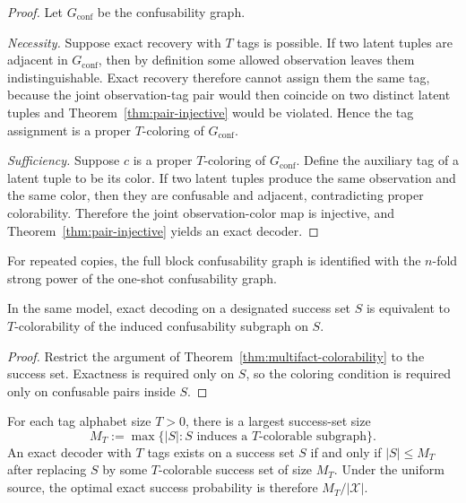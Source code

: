 \begin{proof}
Let $G_{\mathrm{conf}}$ be the confusability graph.

\emph{Necessity.} Suppose exact recovery with $T$ tags is possible. If two latent tuples are adjacent in $G_{\mathrm{conf}}$, then by definition some allowed observation leaves them indistinguishable. Exact recovery therefore cannot assign them the same tag, because the joint observation-tag pair would then coincide on two distinct latent tuples and Theorem~\ref{thm:pair-injective} would be violated. Hence the tag assignment is a proper $T$-coloring of $G_{\mathrm{conf}}$.

\emph{Sufficiency.} Suppose $c$ is a proper $T$-coloring of $G_{\mathrm{conf}}$. Define the auxiliary tag of a latent tuple to be its color. If two latent tuples produce the same observation and the same color, then they are confusable and adjacent, contradicting proper colorability. Therefore the joint observation-color map is injective, and Theorem~\ref{thm:pair-injective} yields an exact decoder.
\end{proof}

For repeated copies, the full block confusability graph is identified with the $n$-fold strong power of the one-shot confusability graph.

\begin{theorem}\label{thm:multifact-success-set}
In the same model, exact decoding on a designated success set $S$ is equivalent to $T$-colorability of the induced confusability subgraph on $S$.
\end{theorem}

\begin{proof}
Restrict the argument of Theorem~\ref{thm:multifact-colorability} to the success set. Exactness is required only on $S$, so the coloring condition is required only on confusable pairs inside $S$.
\end{proof}

\begin{theorem}\label{thm:multifact-max-success}
For each tag alphabet size $T>0$, there is a largest success-set size
\[
M_T := \max\{|S| : S \text{ induces a $T$-colorable subgraph}\}.
\]
An exact decoder with $T$ tags exists on a success set $S$ if and only if $|S|\le M_T$ after replacing $S$ by some $T$-colorable success set of size $M_T$. Under the uniform source, the optimal exact success probability is therefore $M_T/|\mathcal X|$.
\end{theorem}

